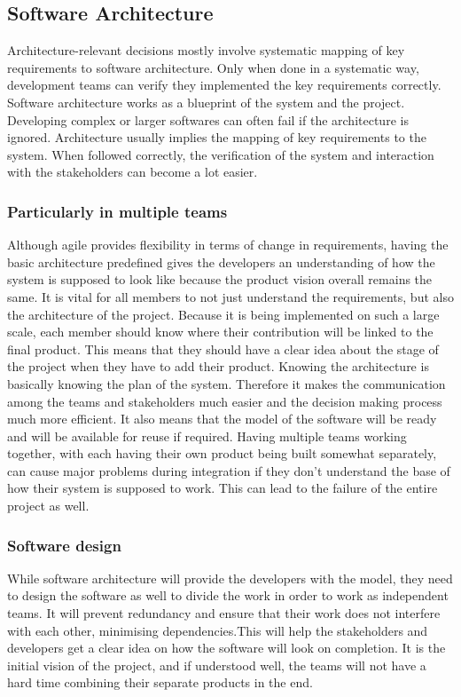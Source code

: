 \documentclass[sigconf]{acmart}
\begin{document}
\subsection{Software Architecture}
Architecture-relevant decisions mostly involve systematic mapping of key requirements to software architecture. Only when done in a systematic way, development teams can verify they implemented the key requirements correctly. Software architecture works as a blueprint of the system and the project. Developing complex or larger softwares can often fail if the architecture is ignored. Architecture usually implies the mapping of key requirements to the system. When followed correctly, the verification of the system and interaction with the stakeholders can become a lot easier.

\subsubsection{Particularly in multiple teams}

Although agile provides flexibility in terms of change in requirements, having the basic architecture predefined gives the developers an understanding of how the system is supposed to look like because the product vision overall remains the same. It is vital for all members to not just understand the requirements, but also the architecture of the project. Because it is being implemented on such a large scale, each member should know where their contribution will be linked to the final product\cite{apiumhub}. This means that they should have a clear idea about the stage of the project when they have to add their product. Knowing the architecture is basically knowing the plan of the system. Therefore it makes the communication among the teams and stakeholders much easier and the decision making process much more efficient. It also means that the model of the software will be ready and will be available for reuse if required. Having multiple teams working together, with each having their own product being built somewhat separately, can cause major problems during integration if they don't understand the base of how their system is supposed to work. This can lead to the failure of the entire project as well.

\subsubsection{Software design}
While software architecture will provide the developers with the model, they need to design the software as well to divide the work in order to work as independent teams. It will prevent redundancy and ensure that their work does not interfere with each other, minimising dependencies\cite{NikolaiH}.This will help the stakeholders and developers get a clear idea on how the software will look on completion. It is the initial vision of the project, and if understood well, the teams will not have a hard time combining their separate products in the end.
\end{document}
